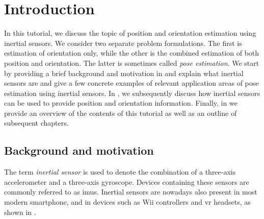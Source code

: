\chapter{Introduction}
\label{cha:introduction} 
In this tutorial, we discuss the topic of position and orientation estimation using inertial sensors. We consider two separate problem formulations. The first is estimation of orientation only, while the other is the combined estimation of both position and orientation. The latter is sometimes called \textit{pose estimation}. We start by providing a brief background and motivation in  and explain what inertial sensors are and give a few concrete examples of relevant application areas of pose estimation using inertial sensors. In , we subsequently discuss how inertial sensors can be used to provide position and orientation information. Finally, in  we provide an overview of the contents of this tutorial as well as an outline of subsequent chapters. 

\section{Background and motivation}
\label{sec:intro-background}
The term \textit{inertial sensor} is used to denote the combination of a three-axis accelerometer and a three-axis gyroscope. Devices containing these sensors are commonly referred to as \glspl{imu}. Inertial sensors are nowadays also present in most modern smartphone, and in devices such as Wii controllers and \gls{vr} headsets, as shown in . 

